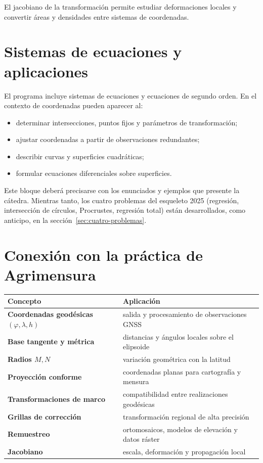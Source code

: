 El jacobiano de la transformación permite estudiar deformaciones locales y convertir áreas
y densidades entre sistemas de coordenadas.

\section{Sistemas de ecuaciones y aplicaciones}\label{sec:sistemas-ecuaciones}

El programa incluye sistemas de ecuaciones y ecuaciones de segundo orden. En el contexto de
coordenadas pueden aparecer al:
\begin{itemize}
  \item determinar intersecciones, puntos fijos y parámetros de transformación;
  \item ajustar coordenadas a partir de observaciones redundantes;
  \item describir curvas y superficies cuadráticas;
  \item formular ecuaciones diferenciales sobre superficies.
\end{itemize}

Este bloque deberá precisarse con los enunciados y ejemplos que presente la cátedra. Mientras tanto, los cuatro problemas del esqueleto 2025 (regresión, intersección de círculos, Procrustes, regresión total) están desarrollados, como anticipo, en la sección~\ref{sec:cuatro-problemas}.

\section{Conexión con la práctica de Agrimensura}

\begin{center}
\begin{tabularx}{\textwidth}{>{\bfseries}p{47mm} X}
\toprule
Concepto & Aplicación\\
\midrule
Coordenadas geodésicas \((\varphi,\lambda,h)\) & salida y procesamiento de observaciones GNSS\\
Base tangente y métrica & distancias y ángulos locales sobre el elipsoide\\
Radios \(M,N\) & variación geométrica con la latitud\\
Proyección conforme & coordenadas planas para cartografía y mensura\\
Transformaciones de marco & compatibilidad entre realizaciones geodésicas\\
Grillas de corrección & transformación regional de alta precisión\\
Remuestreo & ortomosaicos, modelos de elevación y datos ráster\\
Jacobiano & escala, deformación y propagación local\\
\bottomrule
\end{tabularx}
\end{center}

